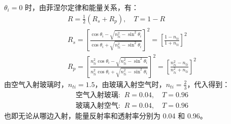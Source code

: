 \documentclass[a4paper]{article}  %
\theoremstyle{MyLineTheoremStyle} %
\theoremstyle{MyBlockTheoremStyle} %
\theoremstyle{MySubsubsectionStyle} %
\begin{document}
\begin{multicols*}{4}
$\theta_i = 0$ 时，由菲涅尔定律和能量关系，有：
\begin{gather}
    R =  \frac{1}{2}(R_s + R_p),\quad  T = 1 - R\\ 
    R_s =  \left[ \frac{ \cos \theta_i - \sqrt{n_{ti}^2 - \sin^2 \theta_i} }{\cos \theta_i + \sqrt{n_{ti}^2 - \sin^2 \theta_i}} \right]^2 = \left[ \frac{1 - n_{ti}}{1 + n_{ti}} \right]^2 
    \\ 
    R_p = \left[ \frac{ n_{ti}^2\cos \theta_i - \sqrt{n_{ti}^2 - \sin^2 \theta_i} }{n_{ti}^2\cos \theta_i + \sqrt{n_{ti}^2 - \sin^2 \theta_i}} \right]^2 =  \left[ \frac{n_{ti}^2 - n_{ti}}{n_{ti}^2 + n_{ti}} \right]^2
\end{gather}
由空气入射玻璃时，$n_{ti} = 1.5$，由玻璃入射空气时，$n_{ti} = \frac{2}{3}$，代入得到：
\begin{gather*}
\text{空气入射玻璃: }\ R = 0.04,\quad  T = 0.96 \\ 
\text{玻璃入射空气: }\ R = 0.04,\quad  T = 0.96 
\end{gather*}
也即无论从哪边入射，能量反射率和透射率分别为 0.04 和 0.96。

























\end{multicols*}  
\end{document}
